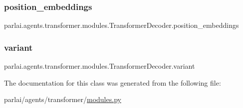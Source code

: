 \subsubsection{\texorpdfstring{position\+\_\+embeddings}{position\_embeddings}}
{\footnotesize\ttfamily parlai.\+agents.\+transformer.\+modules.\+Transformer\+Decoder.\+position\+\_\+embeddings}

\mbox{\label{classparlai_1_1agents_1_1transformer_1_1modules_1_1TransformerDecoder_a84349da2592ce07a34257a3995dd2254}} 
\subsubsection{\texorpdfstring{variant}{variant}}
{\footnotesize\ttfamily parlai.\+agents.\+transformer.\+modules.\+Transformer\+Decoder.\+variant}



The documentation for this class was generated from the following file\+:\begin{DoxyCompactItemize}
\item 
parlai/agents/transformer/\hyperlink{parlai_2agents_2transformer_2modules_8py}{modules.\+py}\end{DoxyCompactItemize}
